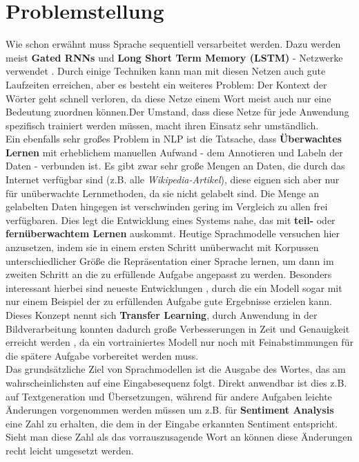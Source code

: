 \section{Problemstellung}
Wie schon erw\"ahnt muss Sprache sequentiell versarbeitet werden. Dazu werden meist \textbf{Gated RNNs} und \textbf{Long Short Term Memory (LSTM)} - Netzwerke verwendet \cite{attention}. Durch einige Techniken kann man mit diesen Netzen auch gute Laufzeiten erreichen, aber es besteht ein weiteres Problem: Der Kontext der W\"orter geht schnell verloren, da diese Netze einem Wort meist auch nur eine Bedeutung zuordnen k\"onnen.Der Umstand, dass diese Netze f\"ur jede Anwendung spezifisch trainiert werden m\"ussen, macht ihren Einsatz sehr umst\"andlich.\\
Ein ebenfalls sehr gro{\ss}es Problem in NLP ist die Tatsache, dass \textbf{\"Uberwachtes Lernen} mit erheblichem manuellen Aufwand - dem Annotieren und Labeln der Daten - verbunden ist. Es gibt zwar sehr gro{\ss}e Mengen an Daten, die durch das Internet verf\"ugbar sind (z.B. alle \textit{Wikipedia-Artikel}), diese eignen sich aber nur f\"ur un\"uberwachte Lernmethoden, da sie nicht gelabelt sind. Die Menge an gelabelten Daten hingegen ist verschwinden gering im Vergleich zu allen frei verf\"ugbaren. Dies legt die Entwicklung eines Systems nahe, das mit \textbf{teil-} oder \textbf{fern\"uberwachtem Lernen} auskommt. Heutige Sprachmodelle versuchen hier anzusetzen, indem sie in einem ersten Schritt un\"uberwacht mit Korpussen unterschiedlicher Gr\"o{\ss}e die Repr\"asentation einer Sprache lernen, um dann im zweiten Schritt an die zu erf\"ullende Aufgabe angepasst zu werden. Besonders interessant hierbei sind neueste Entwicklungen \cite{gpt3}, durch die ein Modell sogar mit nur einem Beispiel der zu erf\"ullenden Aufgabe gute Ergebnisse erzielen kann. Dieses Konzept nennt sich \textbf{Transfer Learning}, durch Anwendung in der Bildverarbeitung konnten dadurch gro{\ss}e Verbesserungen in Zeit und Genauigkeit erreicht werden \cite{ulm}, da ein vortrainiertes Modell nur noch mit Feinabstimmungen f\"ur die sp\"atere Aufgabe vorbereitet werden muss.\\
Das grunds\"atzliche Ziel von Sprachmodellen ist die Ausgabe des Wortes, das am wahrscheinlichsten auf eine Eingabesequenz folgt. Direkt anwendbar ist dies z.B. auf Textgeneration und \"Ubersetzungen, w\"ahrend f\"ur andere Aufgaben leichte \"Anderungen vorgenommen werden m\"ussen um z.B. f\"ur \textbf{Sentiment Analysis} eine Zahl zu erhalten, die dem in der Eingabe erkannten Sentiment entspricht. Sieht man diese Zahl als das vorrauszusagende Wort an k\"onnen diese \"Anderungen recht leicht umgesetzt werden.



